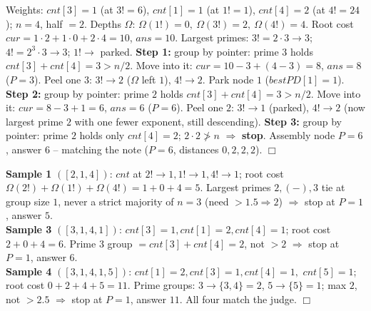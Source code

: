 \begin{tracebox}[Sample 2: collapse, then descend to the centroid \(P=6\)]
Weights: \(\mathit{cnt}[3]{=}1\) (at \(3!{=}6\)), \(\mathit{cnt}[1]{=}1\) (at \(1!{=}1\)),
\(\mathit{cnt}[4]{=}2\) (at \(4!{=}24\)); \(n{=}4\), half \(=2\).
Depths \(\Omega\): \(\Omega(1!){=}0,\ \Omega(3!){=}2,\ \Omega(4!){=}4\). Root cost
\(\mathit{cur}=1{\cdot}2 + 1{\cdot}0 + 2{\cdot}4 = 10\), \(\mathit{ans}{=}10\).
Largest primes: \(3!{=}2{\cdot}3\to3\); \(4!{=}2^3{\cdot}3\to3\); \(1!\to\) parked.
\textbf{Step 1:} group by pointer: prime \(3\) holds \(\mathit{cnt}[3]{+}\mathit{cnt}[4]=3>n/2\).
Move into it: \(\mathit{cur}=10-3+(4-3)=8\), \(\mathit{ans}=8\) (\(P=3\)). Peel one \(3\):
\(3!\to2\) (\(\Omega\) left \(1\)), \(4!\to2\). Park node \(1\) (\(\mathit{bestPD}[1]{=}1\)).
\textbf{Step 2:} group by pointer: prime \(2\) holds \(\mathit{cnt}[3]{+}\mathit{cnt}[4]=3>n/2\).
Move into it: \(\mathit{cur}=8-3+1=6\), \(\mathit{ans}=6\) (\(P=6\)). Peel one \(2\): \(3!\to1\)
(parked), \(4!\to2\) (now largest prime \(2\) with one fewer exponent, still descending).
\textbf{Step 3:} group by pointer: prime \(2\) holds only \(\mathit{cnt}[4]=2\); \(2\cdot2\not>n\)
\(\Rightarrow\) \textbf{stop}. Assembly node \(P=6\), answer \(\boxed{6}\) -- matching the note
(\(P=6\), distances \(0,2,2,2\)). \(\Box\)
\end{tracebox}

\begin{tracebox}
\textbf{Sample 1} \(([2,1,4])\): \(\mathit{cnt}\) at \(2!{\to}1,1!{\to}1,4!{\to}1\); root cost
\(\Omega(2!){+}\Omega(1!){+}\Omega(4!)=1+0+4=5\). Largest primes \(2,(-),3\) tie at group size
\(1\), never a strict majority of \(n{=}3\) (need \(>1.5\Rightarrow2\)) \(\Rightarrow\) stop at
\(P=1\), answer \(\boxed{5}\).\\
\textbf{Sample 3} \(([3,1,4,1])\): \(\mathit{cnt}[3]{=}1,\mathit{cnt}[1]{=}2,\mathit{cnt}[4]{=}1\);
root cost \(2+0+4=6\). Prime \(3\) group \(=\mathit{cnt}[3]{+}\mathit{cnt}[4]=2\), not \(>2\)
\(\Rightarrow\) stop at \(P=1\), answer \(\boxed{6}\).\\
\textbf{Sample 4} \(([3,1,4,1,5])\): \(\mathit{cnt}[1]{=}2,\mathit{cnt}[3]{=}1,\mathit{cnt}[4]{=}1,\)
\(\mathit{cnt}[5]{=}1\); root cost \(0{+}2{+}4{+}5=11\). Prime groups: \(3\to\{3,4\}=2\),
\(5\to\{5\}=1\); max \(2\), not \(>2.5\) \(\Rightarrow\) stop at \(P=1\), answer \(\boxed{11}\).
All four match the judge. \(\Box\)
\end{tracebox}

